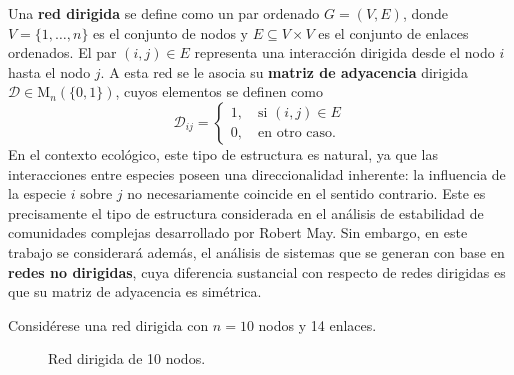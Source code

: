 \begin{definición}
	Una \textbf{red dirigida} se define como un par ordenado $G=(V,E)$, donde $V=\{1,\dots,n\}$ es el conjunto de nodos y $E\subseteq V\times V$ es el conjunto de enlaces ordenados. El par $(i,j)\in E$ representa una interacción dirigida desde el nodo $i$ hasta el nodo $j$. A esta red se le asocia su \textbf{matriz de adyacencia} dirigida $\mathcal{D}\in\mathrm{M}_n(\{0,1\})$, cuyos elementos se definen como
	$$
	\mathcal{D}_{ij}=\begin{cases}
		1,\quad\text{si } (i,j)\in E\\
		0,\quad\text{en otro caso.}
	\end{cases}
	$$
	En el contexto ecológico, este tipo de estructura es natural, ya que las interacciones entre especies poseen una direccionalidad inherente: la influencia de la especie $i$ sobre $j$ no necesariamente coincide en el sentido contrario. Este es precisamente el tipo de estructura considerada en el análisis de estabilidad de comunidades complejas desarrollado por Robert May. Sin embargo, en este trabajo se considerará además, el análisis de sistemas que se generan con base en \textbf{redes no dirigidas}, cuya diferencia sustancial con respecto de redes dirigidas es que su matriz de adyacencia es simétrica.
\end{definición}

\begin{ejemplo}
	Considérese una red dirigida con $n=10$ nodos y 14 enlaces.
\end{ejemplo}

\begin{figure} \vspace{-44pt} \begin{center}
		 
	\end{center} 
	\vspace{-20pt} 
	\caption{Red dirigida de 10 nodos.} 
	\vspace{-150pt}
	\label{fig:Red10Dir}
\end{figure} 

